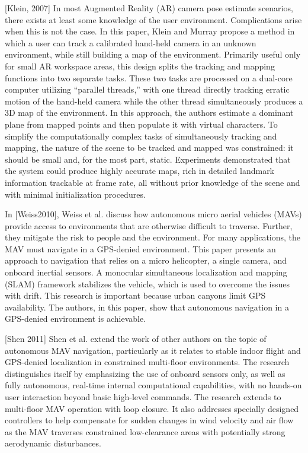 [Klein, 2007] In most Augmented Reality (AR) camera pose estimate scenarios, there exists at least some knowledge of the user environment. Complications arise when this is not the case. In this paper, Klein and Murray propose a method in which a user can track a calibrated hand-held camera in an unknown environment, while still building a map of the environment. Primarily useful only for small AR workspace areas, this design splits the tracking and mapping functions into two separate tasks. These two tasks are processed on a dual-core computer utilizing ``parallel threads,'' with one thread directly tracking erratic motion of the hand-held camera while the other thread simultaneously produces a 3D map of the environment. In this approach, the authors estimate a dominant plane from mapped points and then populate it with virtual characters. To simplify the computationally complex tasks of simultaneously tracking and mapping, the nature of the scene to be tracked and mapped was constrained:  it should be small and, for the most part, static. Experiments demonstrated that the system could produce highly accurate maps, rich in detailed landmark information trackable at frame rate, all without prior knowledge of the scene and with minimal initialization procedures.

In [Weiss2010], Weiss et al. discuss how autonomous micro aerial vehicles (MAVs) provide access to environments that are otherwise difficult to traverse. Further, they mitigate the risk to people and the environment. For many applications, the MAV must navigate in a GPS-denied environment. This paper presents an approach to navigation that relies on a micro helicopter, a single camera, and onboard inertial sensors. A monocular simultaneous localization and mapping (SLAM) framework stabilizes the vehicle, which is used to overcome the issues with drift. This research is important because urban canyons limit GPS availability. The authors, in this paper, show that autonomous navigation in a GPS-denied environment is achievable. 

[Shen 2011] Shen et al. extend the work of other authors on the topic of autonomous MAV navigation, particularly as it relates to stable indoor flight and GPS-denied localization in constrained multi-floor environments. The research distinguishes itself by emphasizing the use of onboard sensors only, as well as fully autonomous, real-time internal computational capabilities, with no hands-on user interaction beyond basic high-level commands. The research extends to multi-floor MAV operation with loop closure. It also addresses specially designed controllers to help compensate for sudden changes in wind velocity and air flow as the MAV traverses constrained low-clearance areas with potentially strong aerodynamic disturbances.


